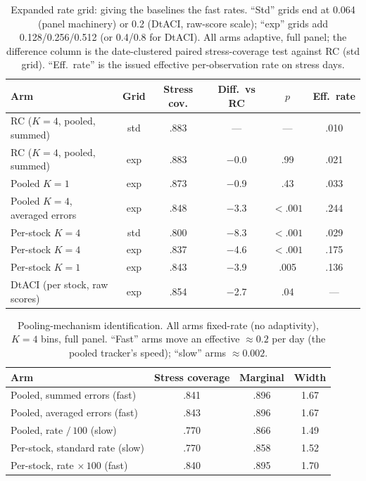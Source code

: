 \begin{table}[t]
\centering
\caption{Expanded rate grid: giving the baselines the fast rates.
``Std'' grids end at 0.064 (panel machinery) or 0.2 (DtACI, raw-score
scale); ``exp'' grids add 0.128/0.256/0.512 (or 0.4/0.8 for DtACI). All
arms adaptive, full panel; the difference column is the date-clustered
paired stress-coverage test against RC (std grid). ``Eff.\ rate'' is the
issued effective per-observation rate on stress days.}
\label{tab:expgrid}
\small
\begin{tabular}{lccccc}
\toprule
Arm & Grid & Stress cov. & Diff.\ vs RC & $p$ & Eff.\ rate \\
\midrule
RC ($K=4$, pooled, summed) & std & .883 & --- & --- & .010 \\
RC ($K=4$, pooled, summed) & exp & .883 & $-$0.0 & .99 & .021 \\
Pooled $K=1$ & exp & .873 & $-$0.9 & .43 & .033 \\
Pooled $K=4$, averaged errors & exp & .848 & $-$3.3 & $<.001$ & .244 \\
Per-stock $K=4$ & std & .800 & $-$8.3 & $<.001$ & .029 \\
Per-stock $K=4$ & exp & .837 & $-$4.6 & $<.001$ & .175 \\
Per-stock $K=1$ & exp & .843 & $-$3.9 & .005 & .136 \\
DtACI (per stock, raw scores) & exp & .854 & $-$2.7 & .04 & --- \\
\bottomrule
\end{tabular}
\end{table}

\begin{table}[t]
\centering
\caption{Pooling-mechanism identification. All arms fixed-rate
(no adaptivity), $K = 4$ bins, full panel. ``Fast'' arms move an
effective $\approx 0.2$ per day (the pooled tracker's speed); ``slow''
arms $\approx 0.002$.}
\label{tab:mechanism}
\small
\begin{tabular}{lccc}
\toprule
Arm & Stress coverage & Marginal & Width \\
\midrule
Pooled, summed errors (fast) & .841 & .896 & 1.67 \\
Pooled, averaged errors (fast) & .843 & .896 & 1.67 \\
Pooled, rate $/\,100$ (slow) & .770 & .866 & 1.49 \\
Per-stock, standard rate (slow) & .770 & .858 & 1.52 \\
Per-stock, rate $\times\,100$ (fast) & .840 & .895 & 1.70 \\
\bottomrule
\end{tabular}
\end{table}

